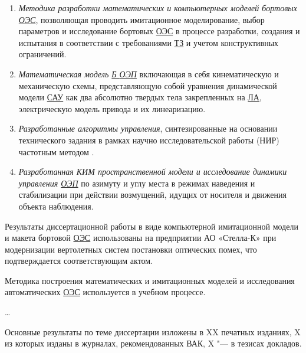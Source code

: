 {}
\begin{enumerate}
  \item \textit{Методика разработки математических и компьютерных моделей бортовых  \hyperref[acroEOS]{ОЭС}}, позволяющая проводить имитационное моделирование, выбор параметров и исследование бортовых  \hyperref[acroEOS]{ОЭС} в процессе разработки, создания и испытания в соответствии с требованиями  \hyperref[acroTZ]{ТЗ} и учетом конструктивных ограничений. 
  \item \textit{Математическая модель  \hyperref[acroAEOS]{Б \hyperref[acroEOS]{ОЭП}}} включающая в себя кинематическую и механическую схемы, представляющую собой уравнения динамической модели  \hyperref[acroSAU]{САУ} как два абсолютно твердых тела закрепленных на  \hyperref[acroLA]{ЛА}, электрическую модель привода и их линеаризацию.
  \item \textit{Разработанные алгоритмы управления}, синтезированные на основании технического задания в рамках научно исследовательской работы (НИР) частотным методом \cite[]{Babaev}.
  \item \textit{Разработанная КИМ пространственной модели и исследование динамики управления  \hyperref[acroEOS]{ОЭП}} по азимуту и углу места в режимах наведения и стабилизации при действии возмущений, идущих от носителя и движения объекта наблюдения.
\end{enumerate}

{\reliability} 


{\probation}
Результаты диссертационной работы в виде компьютерной имитационной модели и макета бортовой  \hyperref[acroEOS]{ОЭС} использованы на предприятии АО «Стелла-К» при модернизации вертолетных систем постановки оптических помех, что подтверждается соответствующим актом.

Методика построения математических и имитационных моделей и исследования автоматических  \hyperref[acroEOS]{ОЭС} используется в учебном процессе.

{\contribution}  \ldots

{\publications} Основные результаты по теме диссертации изложены в XX печатных изданиях,
    X из которых изданы в журналах, рекомендованных ВАК,
    X "--- в тезисах докладов.
    
